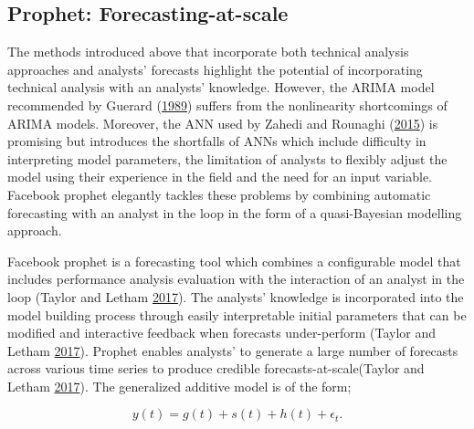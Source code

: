 \documentclass[12pt,preprint, authoryear]{elsarticle}
\numberwithin{equation}{section}
\numberwithin{figure}{section}
\numberwithin{table}{section}
\begin{document}
\subsection{Prophet:
Forecasting-at-scale}\label{prophet-forecasting-at-scale}

The methods introduced above that incorporate both technical analysis
approaches and analysts' forecasts highlight the potential of
incorporating technical analysis with an analysts' knowledge. However,
the ARIMA model recommended by Guerard
(\protect\hyperlink{ref-guerard1989combining}{1989}) suffers from the
nonlinearity shortcomings of ARIMA models. Moreover, the ANN used by
Zahedi and Rounaghi
(\protect\hyperlink{ref-zahedi2015application}{2015}) is promising but
introduces the shortfalls of ANNs which include difficulty in
interpreting model parameters, the limitation of analysts to flexibly
adjust the model using their experience in the field and the need for an
input variable. Facebook prophet elegantly tackles these problems by
combining automatic forecasting with an analyst in the loop in the form
of a quasi-Bayesian modelling approach.

Facebook prophet is a forecasting tool which combines a configurable
model that includes performance analysis evaluation with the interaction
of an analyst in the loop (Taylor and Letham
\protect\hyperlink{ref-taylor2017forecasting}{2017}). The analysts'
knowledge is incorporated into the model building process through easily
interpretable initial parameters that can be modified and interactive
feedback when forecasts under-perform (Taylor and Letham
\protect\hyperlink{ref-taylor2017forecasting}{2017}). Prophet enables
analysts' to generate a large number of forecasts across various time
series to produce credible forecasts-at-scale(Taylor and Letham
\protect\hyperlink{ref-taylor2017forecasting}{2017}). The generalized
additive model is of the form;

\[ y(t) = g(t) + s(t) +  h(t) + \epsilon_t.\]
\end{document}

